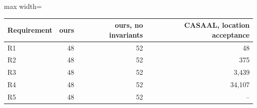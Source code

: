 \begin{adjustbox}{max width=\textwidth}\begin{tabular}{@{}lrrr@{}}
\toprule
Requirement & ours & ours, no invariants & CASAAL, location acceptance \\
\midrule
R1 & 48 & 52 & 48 \\
R2 & 48 & 52 & 375 \\
R3 & 48 & 52 & 3{,}439 \\
R4 & 48 & 52 & 34{,}107 \\
R5 & 48 & 52 & -- \\
\bottomrule
\end{tabular}\end{adjustbox}
